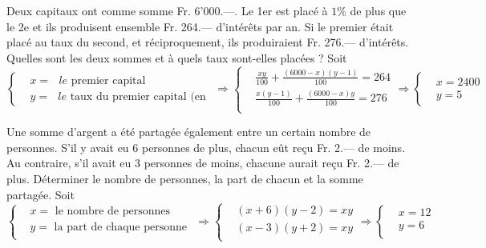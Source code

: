 \begin{solution}
Deux capitaux ont comme somme Fr. 6’000.—. Le 1er est placé à $1 \%$ de plus que le 2e et ils produisent ensemble Fr. 264.— d’intérêts par an. Si le premier était placé au taux du second, et réciproquement, ils produiraient Fr. 276.— d’intérêts. Quelles sont les deux sommes et à quels taux sont-elles placées ?
Soit $\left\{ \begin{array}{ll}
  & x=\text{ }le\text{ premier capital} \\ 
 & y=\text{ }le\text{ taux du premier capital (en  }\!\!%
\end{array} \right.\Rightarrow \left\{ \begin{array}{ll}
  & \frac{xy}{100}+\frac{\left( 6000-x \right)\left( y-1 \right)}{100}=264 \\ 
 & \frac{x\left( y-1 \right)}{100}+\frac{\left( 6000-x \right)y}{100}=276 \\ 
\end{array} \right.\Rightarrow \left\{ \begin{array}{ll}
  & x=2400 \\ 
 & y=5%
\end{array} \right.$
\end{solution}

\begin{solution}
Une somme d’argent a été partagée également entre un certain nombre de personnes. S’il y avait eu 6 personnes de plus, chacun eût reçu Fr. 2.— de moins. Au contraire, s’il avait eu 3 personnes de moins, chacune aurait reçu Fr. 2.— de plus. Déterminer le nombre de personnes, la part de chacun et la somme partagée.
Soit $\left\{ \begin{array}{ll}
  & x=\text{ le nombre de personnes } \\ 
 & y=\text{ la part de chaque personne } \\ 
\end{array} \right.\Rightarrow \left\{ \begin{array}{ll}
  & \left( x+6 \right)\left( y-2 \right)=xy \\ 
 & \left( x-3 \right)\left( y+2 \right)=xy \\ 
\end{array} \right.\Rightarrow \left\{ \begin{array}{ll}
  & x=12 \\ 
 & y=6 \\ 
\end{array} \right.$
\end{solution}

